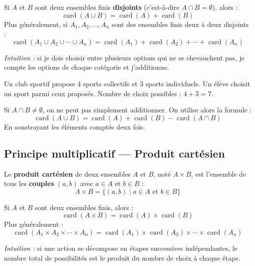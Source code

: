 \documentclass[12pt,a4paper,twoside]{book}
\DeclareMathOperator{\card}{card}
\begin{document}
\begin{propriete}
Si $A$ et $B$ sont deux ensembles finis \textbf{disjoints} (c'est-à-dire $A \cap B = \emptyset$), alors :
\[ \card(A \cup B) = \card(A) + \card(B) \]
Plus généralement, si $A_1, A_2, \ldots, A_n$ sont des ensembles finis deux à deux disjoints :
\[ \card(A_1 \cup A_2 \cup \cdots \cup A_n) = \card(A_1) + \card(A_2) + \cdots + \card(A_n) \]
\end{propriete}

\textit{Intuition :} si je dois choisir entre plusieurs options qui ne se chevauchent pas, je compte les options de chaque catégorie et j'additionne.

\begin{exemple}
Un club sportif propose 4 sports collectifs et 3 sports individuels. Un élève choisit un sport parmi ceux proposés. Nombre de choix possibles : $4 + 3 = 7$.
\end{exemple}

\begin{attention}
Si $A \cap B \neq \emptyset$, on ne peut pas simplement additionner. On utilise alors la formule :
\[ \card(A \cup B) = \card(A) + \card(B) - \card(A \cap B) \]
En soustrayant les éléments comptés deux fois.
\end{attention}

\subsection{Principe multiplicatif — Produit cartésien}

\begin{definition}
Le \textbf{produit cartésien} de deux ensembles $A$ et $B$, noté $A \times B$, est l'ensemble de tous les \textbf{couples} $(a, b)$ avec $a \in A$ et $b \in B$ :
\[ A \times B = \{(a, b) \mid a \in A \text{ et } b \in B\} \]
\end{definition}

\begin{propriete}
Si $A$ et $B$ sont deux ensembles finis, alors :
\[ \card(A \times B) = \card(A) \times \card(B) \]
Plus généralement :
\[ \card(A_1 \times A_2 \times \cdots \times A_n) = \card(A_1) \times \card(A_2) \times \cdots \times \card(A_n) \]
\end{propriete}

\textit{Intuition :} si une action se décompose en étapes successives indépendantes, le nombre total de possibilités est le produit du nombre de choix à chaque étape.
\end{document}
